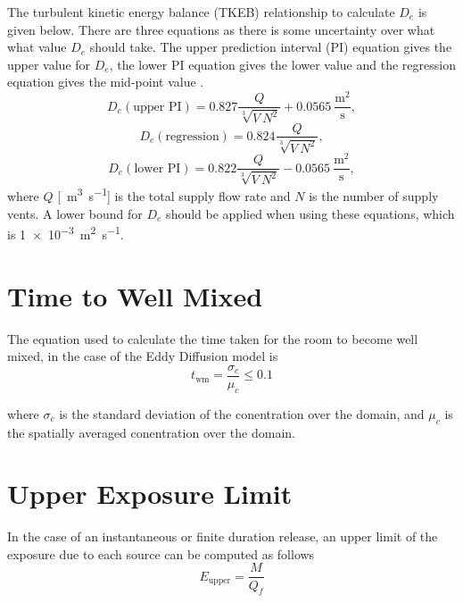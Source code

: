 \documentclass[]{article}
\begin{document}
The turbulent kinetic energy balance (TKEB) relationship to calculate $D_e$ is
given below. There are three equations as there is some uncertainty over what
what value $D_e$ should take. The upper prediction interval (PI) equation gives
the upper value for $D_e$, the lower PI equation gives the lower value and the
regression equation gives the mid-point value \cite{foat20}. 
\begin{equation}\label{eq:karlUpper}
	D_e(\text{upper PI}) = 0.827 \frac{Q}{\sqrt[3]{V\:N^2}} + 0.0565\:\frac{\text{m}^2}{\text{s}},
\end{equation}
\begin{equation}\label{eq:karlRegression}
	D_e(\text{regression}) = 0.824 \frac{Q}{\sqrt[3]{V\:N^2}},
\end{equation}
\begin{equation}\label{eq:karlLower}
	D_e(\text{lower PI}) = 0.822 \frac{Q}{\sqrt[3]{V\:N^2}} - 0.0565\:\frac{\text{m}^2}{\text{s}},
\end{equation}
where $Q$ [\SI{}{\meter\cubed\per\second}] is the total supply flow rate and $N$
is the number of supply vents. A lower bound for $D_e$ should be applied when
using these equations, which is \SI{1e-3}{\meter\squared\per\second}. 

\section{Time to Well Mixed}\label{app:timetowellmixed}
The equation used to calculate the time taken for the room to become well mixed,
in the case of the Eddy Diffusion model is \cite{drescher95}
\begin{equation}
    t_{\text{wm}}=\frac{\sigma_{c}}{\mu_{c}} \leq 0.1
\end{equation}

\noindent where $\sigma_{c}$ is the standard deviation of the conentration over
the domain, and $\mu_{c}$ is the spatially averaged conentration over the
domain.

\section{Upper Exposure Limit}\label{app:upperexpolimit}
In the case of an instantaneous or finite duration release, an upper limit of
the exposure due to each source can be computed as follows \cite{parker16}
\begin{equation}
    E_{\text{upper}} = \frac{M}{Q_{f}}
\end{equation}
\end{document}
